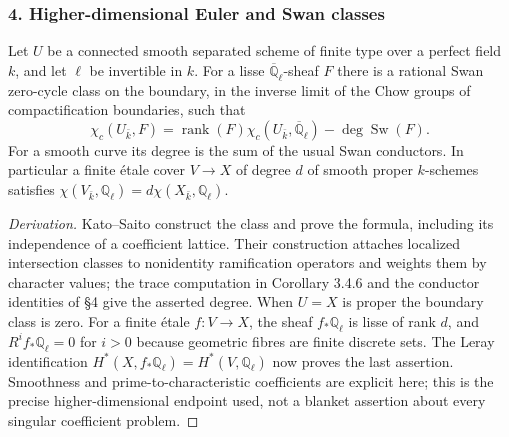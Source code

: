 \subsubsection{4. Higher-dimensional Euler and Swan classes}
\begin{theorem}\label{B:subject4}
Let $U$ be a connected smooth separated scheme of finite type over a perfect field $k$, and let $\ell$ be invertible in $k$. For a lisse $\overline{\mathbb Q}_\ell$-sheaf $F$ there is a rational Swan zero-cycle class on the boundary, in the inverse limit of the Chow groups of compactification boundaries, such that
\[
 \chi_c(U_{\bar k},F)=\operatorname{rank}(F)\chi_c(U_{\bar k},\overline{\mathbb Q}_\ell)
                   -\deg\operatorname{Sw}(F).
\]
For a smooth curve its degree is the sum of the usual Swan conductors. In particular a finite \'etale cover $V\to X$ of degree $d$ of smooth proper $k$-schemes satisfies $\chi(V_{\bar k},\mathbb Q_\ell)=d\chi(X_{\bar k},\mathbb Q_\ell)$.
\end{theorem}
\begin{proof}[Derivation]
Kato--Saito \cite[Definition 4.2.8 and Theorem 4.2.9]{BKatoSaito2008} construct the class and prove the formula, including its independence of a coefficient lattice. Their construction attaches localized intersection classes to nonidentity ramification operators and weights them by character values; the trace computation in Corollary 3.4.6 and the conductor identities of \S4 give the asserted degree. When $U=X$ is proper the boundary class is zero. For a finite \'etale $f:V\to X$, the sheaf $f_*\mathbb Q_\ell$ is lisse of rank $d$, and $R^if_*\mathbb Q_\ell=0$ for $i>0$ because geometric fibres are finite discrete sets. The Leray identification $H^*(X,f_*\mathbb Q_\ell)=H^*(V,\mathbb Q_\ell)$ now proves the last assertion. Smoothness and prime-to-characteristic coefficients are explicit here; this is the precise higher-dimensional endpoint used, not a blanket assertion about every singular coefficient problem.
\end{proof}

